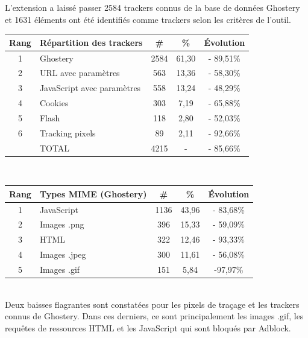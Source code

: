 L'extension a laissé passer 2584 trackers connus de la base de données Ghostery et 1631 éléments ont été identifiés comme trackers selon les critères de l'outil.\\

\begin{tabular}{ c | p{5cm} | c | c || c | }
   Rang & Répartition des trackers & \# & \% & Évolution \\
   \hline
   \hline
   1 & Ghostery & 2584 & 61,30 & - 89,51\% \\
   2 & URL avec paramètres & 563 & 13,36 & - 58,30\% \\
   3 & JavaScript avec paramètres & 558 & 13,24 & - 48,29\% \\
   4 & Cookies & 303 & 7,19 & - 65,88\% \\
   5 & Flash & 118 & 2,80 & - 52,03\% \\
   6 & Tracking pixels & 89 & 2,11 & - 92,66\% \\
   \hline
    & TOTAL & 4215 & - & - 85,66\%\\
   \hline
\end{tabular}
\\[1cm]

\begin{tabular}{ c | p{5cm} | c | c | c | }
   Rang & Types MIME (Ghostery) & \# & \% & Évolution\\
   \hline
   \hline
   1 & JavaScript & 1136 & 43,96 & - 83,68\% \\
   2 & Images .png & 396 & 15,33 & - 59,09\% \\
   3 & HTML & 322 & 12,46 & - 93,33\% \\
   4 & Images .jpeg & 300 & 11,61 & - 56,08\% \\
   5 & Images .gif & 151 & 5,84 & -97,97\% \\
   \hline
\end{tabular}
\\[.3cm]

Deux baisses flagrantes sont constatées pour les pixels de traçage et les trackers connus de Ghostery. Dans ces derniers, ce sont principalement les images .gif, les requêtes de ressources HTML et les JavaScript qui sont bloqués par Adblock.


